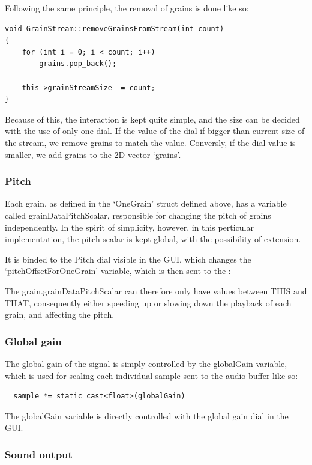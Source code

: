 Following the same principle, the removal of grains is done like so:
\begin{lstlisting}
void GrainStream::removeGrainsFromStream(int count)
{
    for (int i = 0; i < count; i++)
        grains.pop_back();
    
    this->grainStreamSize -= count;
}
\end{lstlisting}

Because of this, the interaction is kept quite simple, and the size
can be decided with the use of only one dial. If the value of the dial
if bigger than current size of the stream, we remove grains to match
the value. Conversly, if the dial value is smaller, we add grains to
the 2D vector `grains'.

\subsubsection{Pitch}
Each grain, as defined in the `OneGrain' struct defined above, has a
variable called grainDataPitchScalar, responsible for changing the
pitch of grains independently. In the spirit of simplicity, however,
in this perticular implementation, the pitch scalar is kept global,
with the possibility of extension.

It is binded to the Pitch dial visible in the GUI, which changes the
`pitchOffsetForOneGrain' variable, which is then sent to the :


The grain.grainDataPitchScalar can therefore only have values between
THIS and THAT, consequently either speeding up or slowing down the
playback of each grain, and affecting the pitch.

\subsubsection{Global gain}
The global gain of the signal is simply controlled by the globalGain
variable, which is used for scaling each individual sample sent to the
audio buffer like so:
\begin{lstlisting}
  sample *= static_cast<float>(globalGain)
\end{lstlisting}

The globalGain variable is directly controlled with the global gain
dial in the GUI.

\subsubsection{Sound output}

